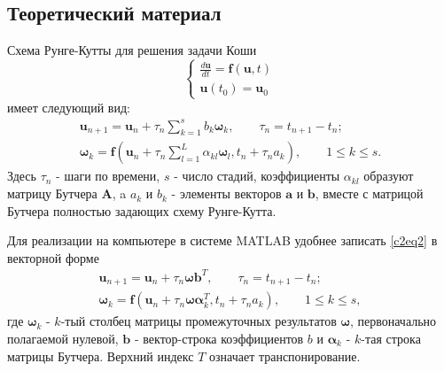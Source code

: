 \chapter{}

\section{Теоретический материал}
Схема Рунге-Кутты для решения задачи Коши
\begin{equation} \label{c2eq1}
	\begin{cases}
		\displaystyle \frac{d\mathbf{u}}{dt} = \mathbf{f} \left( \mathbf{u}, t \right) \\
		\mathbf{u}(t_0) = \mathbf{u}_0
	\end{cases}
\end{equation}
имеет следующий вид:
\begin{equation} \label{c2eq2}
	\begin{split}
		\mathbf{u}_{n+1} = \mathbf{u}_n + \tau_n \sum_{k=1}^{s} b_k \boldsymbol{\omega}_k, 
	\qquad
		\tau_n = t_{n+1} - t_n; \\
		\boldsymbol{\omega}_k = \mathbf{f} \left( \mathbf{u}_n + \tau_n \sum_{l=1}^{L} \alpha_{kl} \boldsymbol{\omega}_l, t_n + \tau_n a_k \right),
	\qquad
		1 \le k \le s.
	\end{split}
\end{equation}
Здесь $\tau_n$ - шаги по времени, $s$ - число стадий, коэффициенты $\alpha_{kl}$ образуют матрицу Бутчера $\mathbf{A}$, a $a_k$ и $b_k$ - элементы векторов $\mathbf{a}$ и $\mathbf{b}$, вместе с матрицой Бутчера полностью задающих схему Рунге-Кутта.

Для реализации на компьютере в системе MATLAB удобнее записать \eqref{c2eq2} в векторной форме
\begin{equation} \label{c2eq3}
	\begin{split}
		\mathbf{u}_{n+1} = \mathbf{u}_n + \tau_n \boldsymbol{\omega} \mathbf{b}^T,
	\qquad
		\tau_n = t_{n+1} - t_n; \\
		\boldsymbol{\omega}_k = \mathbf{f} \left( \mathbf{u}_n + \tau_n \boldsymbol{\omega} \boldsymbol{\alpha}^T_k, t_n + \tau_n a_k \right),
	\qquad
		1 \le k \le s,
	\end{split} 
\end{equation}
где $\boldsymbol{\omega}_k$ - $k$-тый столбец матрицы промежуточных результатов $\boldsymbol{\omega}$, первоначально полагаемой нулевой, $\mathbf{b}$ - вектор-строка коэффициентов $b$ и $\boldsymbol{\alpha}_k$ - $k$-тая строка матрицы Бутчера. Верхний индекс $T$ означает транспонирование.

